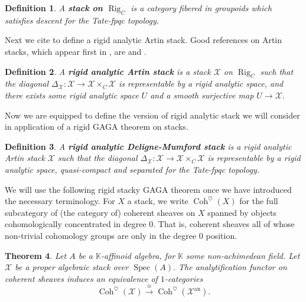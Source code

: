\documentclass[11pt]{amsart}
\newtheorem{theorem}{Theorem}[section]
\newtheorem{definition}[theorem]{Definition}
\theoremstyle{definition}
\numberwithin{equation}{section}
\newcommand{\Spec}{\operatorname{Spec}} 	%
\newcommand{\sX}{\mathscr{X}}		%
\newcommand{\bbK}{\mathbb{K}}		%
\begin{document}
		\begin{definition}
			A \textbf{stack on $\operatorname{Rig}_C$} is a category fibered in groupoids which satisfies descent for the Tate-fpqc topology. 
		\end{definition}
		
		Next we cite \cite{Emerton-Gee-Hellman-categorical-p-adic-langlands} to define a rigid analytic Artin stack. Good references on Artin stacks, which appear first in \cite{Artin-versal-deformations-algebraic-stacks}, are  \cite{Abramovich-Olsson-Vistoli-tame-stacks-pos-characteristic} and \cite{Abramovich-Olsson-Vistoli-twisted-stable-maps-tame-Artin-stacks}.
		
		\begin{definition}\cite[$5.1.10$]{Emerton-Gee-Hellman-categorical-p-adic-langlands}
			A \textbf{rigid analytic Artin stack} is a stack $\sX$ on $\operatorname{Rig}_C$ such that the diagonal $\Delta_{\sX}:\sX\to \sX\times_C \sX$ is representable by a rigid analytic space, and there exists some rigid analytic space $U$ and a smooth surjective map $U\to \sX.$
		\end{definition}
		
		Now we are equipped to define the version of rigid analytic stack we will consider in application of a rigid GAGA theorem on stacks. 
		
		\begin{definition}
			\label{def: rigid analytic DM stack v2}
			A \textbf{rigid analytic Deligne-Mumford stack} is a rigid analytic Artin stack $\sX$ such that the diagonal $\Delta_{\sX}:\sX\to \sX\times_C\sX$ is representable by a rigid analytic space, quasi-compact and separated for the Tate-fpqc topology. 
		\end{definition}
		
		We will use the following rigid stacky GAGA theorem once we have introduced the necessary terminology. For $X$ a stack, we write $\operatorname{Coh}^{\heartsuit}(X)$ for the full subcategory of (the category of) coherent sheaves on $X$ spanned by objects cohomologically concentrated in degree $0.$ That is, coherent sheaves all of whose non-trivial cohomology groups are only in the degree $0$ position.
		
		\begin{theorem}\cite[$7.4$]{Porta-Yu-Higher-analytic-stacks-GAGA}\label{t: rigid stacky GAGA}
			Let $A$ be a $\bbK$-affinoid algebra, for $\bbK$ some non-achimedean field. Let $\sX$ be a proper algebraic stack over $\Spec(A).$ The analytification functor on coherent sheaves induces an equivalence of $1$-categories
			\[\operatorname{Coh}^{\heartsuit}(\sX)\overset{\cong}{\to} \operatorname{Coh}^{\heartsuit}(\sX^{\text{an}}).\] 
		\end{theorem}
		
\end{document}
